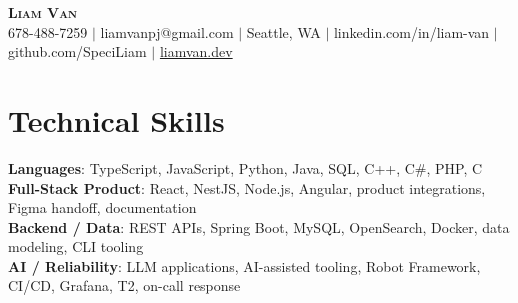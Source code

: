 \documentclass[letterpaper,11pt]{article}
\begin{document}

%
\begin{center}
    \textbf{\Huge \scshape Liam Van} \\ \vspace{1pt}
    \small 678-488-7259 $|$ \small {liamvanpj@gmail.com} $|$ Seattle, WA
 {{$|$ linkedin.com/in/liam-van} {$|$ github.com/SpeciLiam} {$|$ \href{https://liamvan.dev}{liamvan.dev}}}

\end{center}

\section{Technical Skills}
 \begin{itemize}[leftmargin=0.15in, label={}]
    \small{\item{
     \textbf{Languages}{: TypeScript, JavaScript, Python, Java, SQL, C++, C\#, PHP, C} \\
     \textbf{Full-Stack Product}{: React, NestJS, Node.js, Angular, product integrations, Figma handoff, documentation} \\
     \textbf{Backend / Data}{: REST APIs, Spring Boot, MySQL, OpenSearch, Docker, data modeling, CLI tooling} \\
     \textbf{AI / Reliability}{: LLM applications, AI-assisted tooling, Robot Framework, CI/CD, Grafana, T2, on-call response} \\
    }}
 \end{itemize}
%

\end{document}
